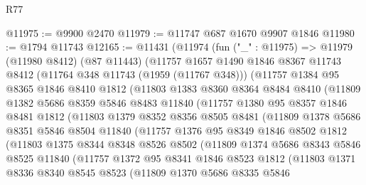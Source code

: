 \begin{lexlean}{R77}
\begin{coremodule}
@11975 := @9900 @2470
@11979 := @11747 @687 @1670 @9907 @1846
@11980 := @1794 @11743
@12165 := @11431
    (@11974
      (fun ("_" : @11975) =>
      @11979
        (@11980 @8412)
        (@87 @11443)
        (@11757
          @1657
          @1490
          @1846
          @8367
          @11743
          @8412
          (@11764 @348 @11743 (@1959 (@11767 @348)))
          (@11757
            @1384
            @95
            @8365
            @1846
            @8410
            @1812
            (@11803
              @1383
              @8360
              @8364
              @8484
              @8410
              (@11809
                @1382
                @5686
                @8359
                @5846
                @8483
                @11840
                (@11757
                  @1380
                  @95
                  @8357
                  @1846
                  @8481
                  @1812
                  (@11803
                    @1379
                    @8352
                    @8356
                    @8505
                    @8481
                    (@11809
                      @1378
                      @5686
                      @8351
                      @5846
                      @8504
                      @11840
                      (@11757
                        @1376
                        @95
                        @8349
                        @1846
                        @8502
                        @1812
                        (@11803
                          @1375
                          @8344
                          @8348
                          @8526
                          @8502
                          (@11809
                            @1374
                            @5686
                            @8343
                            @5846
                            @8525
                            @11840
                            (@11757
                              @1372
                              @95
                              @8341
                              @1846
                              @8523
                              @1812
                              (@11803
                                @1371
                                @8336
                                @8340
                                @8545
                                @8523
                                (@11809
                                  @1370
                                  @5686
                                  @8335
                                  @5846

\end{coremodule}
\end{lexlean}
